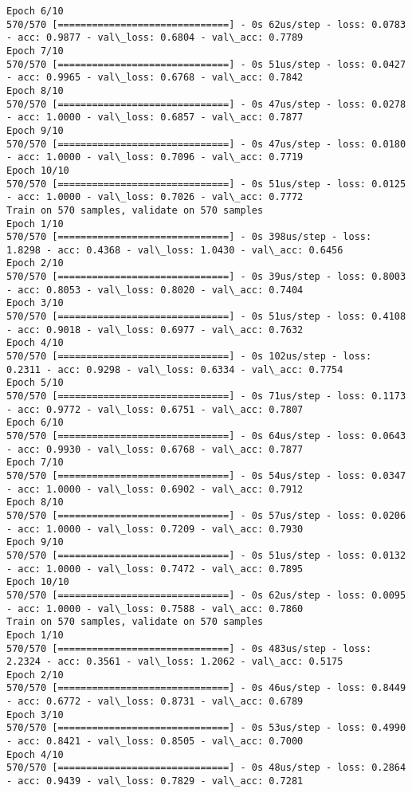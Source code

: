 \documentclass[11pt]{article}
\begin{document}
\begin{Verbatim}[commandchars=\\\{\}]
Epoch 6/10
570/570 [==============================] - 0s 62us/step - loss: 0.0783 - acc: 0.9877 - val\_loss: 0.6804 - val\_acc: 0.7789
Epoch 7/10
570/570 [==============================] - 0s 51us/step - loss: 0.0427 - acc: 0.9965 - val\_loss: 0.6768 - val\_acc: 0.7842
Epoch 8/10
570/570 [==============================] - 0s 47us/step - loss: 0.0278 - acc: 1.0000 - val\_loss: 0.6857 - val\_acc: 0.7877
Epoch 9/10
570/570 [==============================] - 0s 47us/step - loss: 0.0180 - acc: 1.0000 - val\_loss: 0.7096 - val\_acc: 0.7719
Epoch 10/10
570/570 [==============================] - 0s 51us/step - loss: 0.0125 - acc: 1.0000 - val\_loss: 0.7026 - val\_acc: 0.7772
Train on 570 samples, validate on 570 samples
Epoch 1/10
570/570 [==============================] - 0s 398us/step - loss: 1.8298 - acc: 0.4368 - val\_loss: 1.0430 - val\_acc: 0.6456
Epoch 2/10
570/570 [==============================] - 0s 39us/step - loss: 0.8003 - acc: 0.8053 - val\_loss: 0.8020 - val\_acc: 0.7404
Epoch 3/10
570/570 [==============================] - 0s 51us/step - loss: 0.4108 - acc: 0.9018 - val\_loss: 0.6977 - val\_acc: 0.7632
Epoch 4/10
570/570 [==============================] - 0s 102us/step - loss: 0.2311 - acc: 0.9298 - val\_loss: 0.6334 - val\_acc: 0.7754
Epoch 5/10
570/570 [==============================] - 0s 71us/step - loss: 0.1173 - acc: 0.9772 - val\_loss: 0.6751 - val\_acc: 0.7807
Epoch 6/10
570/570 [==============================] - 0s 64us/step - loss: 0.0643 - acc: 0.9930 - val\_loss: 0.6768 - val\_acc: 0.7877
Epoch 7/10
570/570 [==============================] - 0s 54us/step - loss: 0.0347 - acc: 1.0000 - val\_loss: 0.6902 - val\_acc: 0.7912
Epoch 8/10
570/570 [==============================] - 0s 57us/step - loss: 0.0206 - acc: 1.0000 - val\_loss: 0.7209 - val\_acc: 0.7930
Epoch 9/10
570/570 [==============================] - 0s 51us/step - loss: 0.0132 - acc: 1.0000 - val\_loss: 0.7472 - val\_acc: 0.7895
Epoch 10/10
570/570 [==============================] - 0s 62us/step - loss: 0.0095 - acc: 1.0000 - val\_loss: 0.7588 - val\_acc: 0.7860
Train on 570 samples, validate on 570 samples
Epoch 1/10
570/570 [==============================] - 0s 483us/step - loss: 2.2324 - acc: 0.3561 - val\_loss: 1.2062 - val\_acc: 0.5175
Epoch 2/10
570/570 [==============================] - 0s 46us/step - loss: 0.8449 - acc: 0.6772 - val\_loss: 0.8731 - val\_acc: 0.6789
Epoch 3/10
570/570 [==============================] - 0s 53us/step - loss: 0.4990 - acc: 0.8421 - val\_loss: 0.8505 - val\_acc: 0.7000
Epoch 4/10
570/570 [==============================] - 0s 48us/step - loss: 0.2864 - acc: 0.9439 - val\_loss: 0.7829 - val\_acc: 0.7281

\end{Verbatim}
\end{document}
